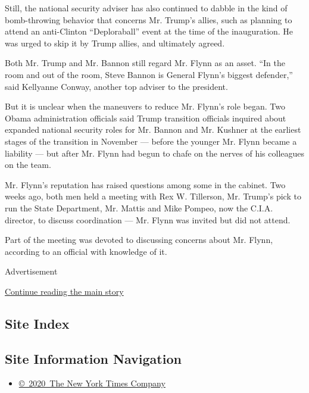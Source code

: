 Still, the national security adviser has also continued to dabble in the
kind of bomb-throwing behavior that concerns Mr. Trump's allies, such as
planning to attend an anti-Clinton ``Deploraball'' event at the time of
the inauguration. He was urged to skip it by Trump allies, and
ultimately agreed.

Both Mr. Trump and Mr. Bannon still regard Mr. Flynn as an asset. ``In
the room and out of the room, Steve Bannon is General Flynn's biggest
defender,'' said Kellyanne Conway, another top adviser to the president.

But it is unclear when the maneuvers to reduce Mr. Flynn's role began.
Two Obama administration officials said Trump transition officials
inquired about expanded national security roles for Mr. Bannon and Mr.
Kushner at the earliest stages of the transition in November --- before
the younger Mr. Flynn became a liability --- but after Mr. Flynn had
begun to chafe on the nerves of his colleagues on the team.

Mr. Flynn's reputation has raised questions among some in the cabinet.
Two weeks ago, both men held a meeting with Rex W. Tillerson, Mr.
Trump's pick to run the State Department, Mr. Mattis and Mike Pompeo,
now the C.I.A. director, to discuss coordination --- Mr. Flynn was
invited but did not attend.

Part of the meeting was devoted to discussing concerns about Mr. Flynn,
according to an official with knowledge of it.

Advertisement

\protect\hyperlink{after-bottom}{Continue reading the main story}

\hypertarget{site-index}{%
\subsection{Site Index}\label{site-index}}

\hypertarget{site-information-navigation}{%
\subsection{Site Information
Navigation}\label{site-information-navigation}}

\begin{itemize}
\tightlist
\item
  \href{https://help.nytimes.com/hc/en-us/articles/115014792127-Copyright-notice}{©~2020~The
  New York Times Company}
\end{itemize}

